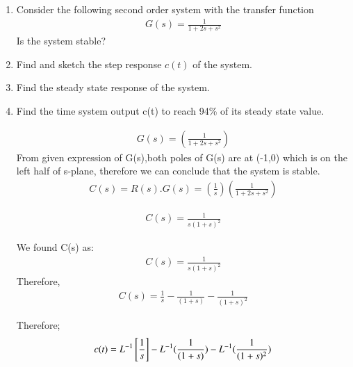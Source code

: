 \begin{enumerate}[label=\thesection.\arabic*.,ref=\thesection.\theenumi]
\item
Consider the following second order system with the transfer function
\begin{align}
G(s) = \frac{1}{1+2s+s^2}
\end{align}
Is the system stable? 
\\
\solution 
\item Find and sketch the step response $c(t)$ of the system.
\\
\solution 

\item Find the steady state response of the system.
\\
\solution 

\item Find the time system output c(t) to reach 94\% of its steady state value.
\\
\solution 


\solution 
\begin{align}
G(s) = (\frac{1}{1+2s+s^2})
\end{align}
From given expression of G(s),both poles of G(s) are at (-1,0) which is on the left half of s-plane, therefore we can conclude that the system is stable.
\begin{align}
C(s) = R(s).G(s) = (\frac{1}{s})  (\frac{1}{1+2s+s^2})
\end{align}

\begin{align}
C(s) =  \frac{1}{s(1+s)^2}
\end{align}


We found C(s) as:
\begin{align}
C(s) =  \frac{1}{s(1+s)^2}
\end{align}
Therefore,
\begin{align}
C(s) = \frac{1}{s} - \frac{1}{(1+s)} - \frac{1}{(1+s)^2}
\end{align}


Therefore;
\begin{align}
c(t) = L^{-1} {}\left[ \frac{1}{s}\right] - L^{-1}(\frac{1}{(1+s)}) - L^{-1}(\frac{1}{(1+s)^2}) 
\end{align}


\end{enumerate}
